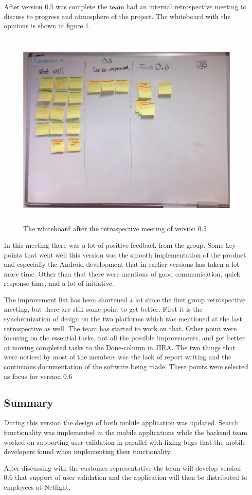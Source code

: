After version 0.5 was complete the team had an internal retrospective meeting to discuss to progress and atmosphere of the project. The whiteboard with the opinions is shown in figure \ref{fig:retrospective-5}.
\begin{figure}
\centering
\includegraphics[height=10cm]{figs/v05/retrospective-5.JPG}
\caption{The whiteboard after the retrospective meeting of version 0.5}
\label{fig:retrospective-5}
\end{figure}

In this meeting there was a lot of positive feedback from the group. Some key points that went well this version was the smooth implementation of the product and especially the Android development that in earlier versions has taken a lot more time. Other than that there were mentions of good communication, quick response time, and a lot of initiative.

The improvement list has been shortened a lot since the first group retrospective meeting, but there are still some point to get better. First it is the synchronization of design on the two platforms which was mentioned at the last retrospective as well. The team has started to work on that. Other point were focusing on the essential tasks, not all the possible improvements, and get better at moving completed tasks to the Done-column in JIRA. The two things that were noticed by most of the members was the lack of report writing and the continuous documentation of the software being made. These points were selected as focus for version 0.6


\subsection{Summary}
During this version the design of both mobile application was updated. Search functionality was implemented in the mobile applications while the backend team worked on supporting user validation in parallel with fixing bugs that the mobile developers found when implementing their functionality. 

After discussing with the customer representative the team will develop version 0.6 that support of user validation and the application will then be distributed to employees at Netlight. 